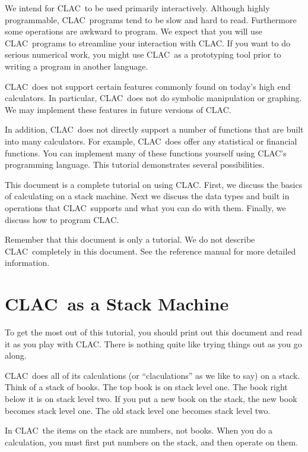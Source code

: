 \documentclass{report}
\newcommand{\CLAC}{CLAC}
\begin{document}
We intend for \CLAC\ to be used primarily interactively. Although highly programmable, \CLAC\ programs tend to be slow and hard to read. Furthermore some operations are awkward to program. We expect that you will use \CLAC\ programs to streamline your interaction with \CLAC. If you want to do serious numerical work, you might use \CLAC\ as a prototyping tool prior to writing a program in another language.

\CLAC\ does not support certain features commonly found on today's high end calculators. In particular, \CLAC\ does not do symbolic manipulation or graphing. We may implement these features in future versions of \CLAC.

In addition, \CLAC\ does not directly support a number of functions that are built into many calculators. For example, \CLAC\ does offer any statistical or financial functions. You can implement many of these functions yourself using \CLAC's programming language. This tutorial demonstrates several possibilities.

This document is a complete tutorial on using \CLAC. First, we discuss the basics of calculating on a stack machine. Next we discuss the data types and built in operations that \CLAC\ supports and what you can do with them. Finally, we discuss how to program \CLAC.

Remember that this document is only a tutorial. We do not describe \CLAC\ completely in this document. See the reference manual for more detailed information.

\chapter{\CLAC\ as a Stack Machine}

To get the most out of this tutorial, you should print out this document and read it as you play with \CLAC. There is nothing quite like trying things out as you go along.

\CLAC\ does all of its calculations (or ``claculations'' as we like to say) on a stack. Think of a stack of books. The top book is on stack level one. The book right below it is on stack level two. If you put a new book on the stack, the new book becomes stack level one. The old stack level one becomes stack level two.

In \CLAC\ the items on the stack are numbers, not books. When you do a calculation, you must first put numbers on the stack, and then operate on them.
\end{document}
